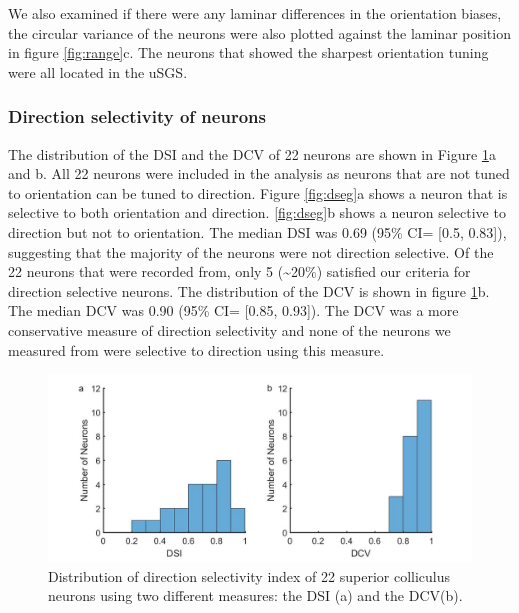 We also examined if there were any laminar differences in the
orientation biases, the circular variance of the neurons were also
plotted against the laminar position in figure \ref{fig:range}c. The neurons that
showed the sharpest orientation tuning were all located in the uSGS.	
	

	
	
	\subsubsection{Direction selectivity of neurons}
The distribution of the DSI and the DCV of 22 neurons are shown in
Figure \ref{fig:ds}a and b. All 22 neurons were included in the analysis as neurons
that are not tuned to orientation can be tuned to direction. Figure \ref{fig:dseg}a
shows a neuron that is selective to both orientation and direction. \ref{fig:dseg}b
shows a neuron selective to direction but not to orientation. The median
DSI was 0.69 (95\% CI= {[}0.5, 0.83{]}), suggesting that the majority of
the neurons were not direction selective. Of the 22 neurons that were
recorded from, only 5 (\textasciitilde{}20\%) satisfied our criteria for
direction selective neurons. The distribution of the DCV is shown in
figure \ref{fig:ds}b. The median DCV was 0.90 (95\% CI= {[}0.85, 0.93{]}). The DCV
was a more conservative measure of direction selectivity and none of the
neurons we measured from were selective to direction using this measure.
	
	\begin{figure}[H]
		\includegraphics[width=\linewidth]{superiorcolliculus/directionselectivity_fig.jpg}
		\caption{Distribution of direction selectivity index of 22
				superior colliculus neurons using two different measures: the DSI (a)
				and the DCV(b).}
		\label{fig:ds}			
	\end{figure}
	
